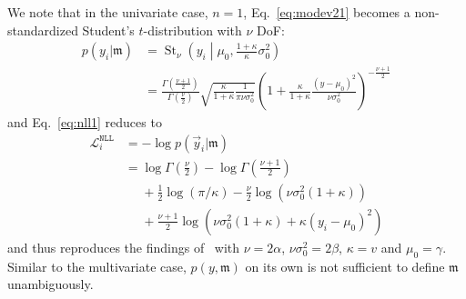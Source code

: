 \documentclass{article}
\begin{document}
We note that in the univariate case, $n=1$, Eq.~\eqref{eq:modev21} becomes a non-standardized Student's $t$-distribution with $\nu$ DoF:
\begin{align*}
    p(y_i | \mathfrak{m}) &= \operatorname{St}_\nu \left( y_i \middle| \mu_0, \frac{1 + \kappa}{\kappa} \sigma_0^2 \right) \\
    &= \frac{\Gamma\!\left( \frac{\nu + 1}{2} \right)}{\Gamma\!\left( \frac{\nu}{2} \right)} \sqrt{\frac{\kappa}{1 + \kappa} \frac{1}{\pi \nu \sigma_0^2}} \left( 1 + \frac{\kappa}{1 + \kappa} \frac{(y - \mu_0)^2}{\nu \sigma_0^2} \right)^{-\frac{\nu + 1}{2}}
\end{align*}
and Eq.~\eqref{eq:nll1} reduces to
\begin{align*}
    \mathcal{L}^{\texttt{NLL}}_i &= - \log p(\vec{y}_i | \mathfrak{m}) \\
    &= \log \Gamma\!\left( \frac{\nu}{2} \right) - \log \Gamma\!\left( \frac{\nu + 1}{2} \right) \\
    &\phantom{=} + \frac{1}{2} \log(\pi  / \kappa) - \frac{\nu}{2} \log(\nu \sigma_0^2 (1 + \kappa)) \\
    &\phantom{=} + \frac{\nu + 1}{2} \log( \nu \sigma_0^2 (1 + \kappa) + \kappa (y_i - \mu_0)^2)
\end{align*}
and thus reproduces the findings of~\cite{amini20} with $\nu = 2\alpha$, $\nu \sigma_0^2 = 2\beta$, $\kappa = v$ and $\mu_0 = \gamma$.
Similar to the multivariate case, $p(y, \mathfrak{m})$ on its own is not sufficient to define $\mathfrak{m}$ unambiguously.
\end{document}

